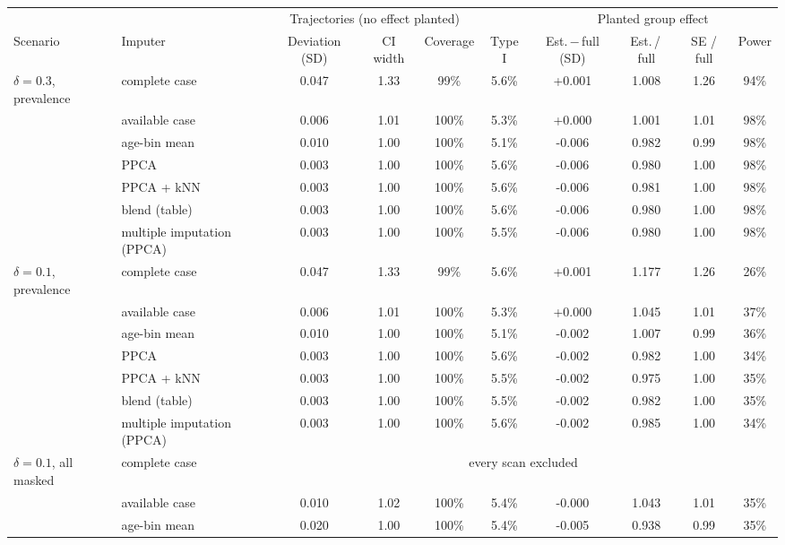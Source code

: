 \begin{tabular}{llcccccccc}
\toprule
 & & \multicolumn{3}{c}{Trajectories (no effect planted)} & & \multicolumn{4}{c}{Planted group effect} \\
\cmidrule(lr){3-5}\cmidrule(lr){7-10}
Scenario & Imputer & Deviation (SD) & CI width & Coverage & Type I & Est.\,$-$\,full (SD) & Est.\,/\,full & SE / full & Power \\
\midrule
$\delta=0.3$, prevalence & complete case & 0.047 & 1.33 & 99\% & 5.6\% & +0.001 & 1.008 & 1.26 & 94\% \\
 & available case & 0.006 & 1.01 & 100\% & 5.3\% & +0.000 & 1.001 & 1.01 & 98\% \\
 & age-bin mean & 0.010 & 1.00 & 100\% & 5.1\% & -0.006 & 0.982 & 0.99 & 98\% \\
 & PPCA & 0.003 & 1.00 & 100\% & 5.6\% & -0.006 & 0.980 & 1.00 & 98\% \\
 & PPCA + kNN & 0.003 & 1.00 & 100\% & 5.6\% & -0.006 & 0.981 & 1.00 & 98\% \\
 & blend (table) & 0.003 & 1.00 & 100\% & 5.6\% & -0.006 & 0.980 & 1.00 & 98\% \\
 & multiple imputation (PPCA) & 0.003 & 1.00 & 100\% & 5.5\% & -0.006 & 0.980 & 1.00 & 98\% \\
\addlinespace[2pt]
$\delta=0.1$, prevalence & complete case & 0.047 & 1.33 & 99\% & 5.6\% & +0.001 & 1.177 & 1.26 & 26\% \\
 & available case & 0.006 & 1.01 & 100\% & 5.3\% & +0.000 & 1.045 & 1.01 & 37\% \\
 & age-bin mean & 0.010 & 1.00 & 100\% & 5.1\% & -0.002 & 1.007 & 0.99 & 36\% \\
 & PPCA & 0.003 & 1.00 & 100\% & 5.6\% & -0.002 & 0.982 & 1.00 & 34\% \\
 & PPCA + kNN & 0.003 & 1.00 & 100\% & 5.5\% & -0.002 & 0.975 & 1.00 & 35\% \\
 & blend (table) & 0.003 & 1.00 & 100\% & 5.5\% & -0.002 & 0.982 & 1.00 & 35\% \\
 & multiple imputation (PPCA) & 0.003 & 1.00 & 100\% & 5.6\% & -0.002 & 0.985 & 1.00 & 34\% \\
\addlinespace[2pt]
$\delta=0.1$, all masked & complete case & \multicolumn{8}{c}{every scan excluded} \\
 & available case & 0.010 & 1.02 & 100\% & 5.4\% & -0.000 & 1.043 & 1.01 & 35\% \\
 & age-bin mean & 0.020 & 1.00 & 100\% & 5.4\% & -0.005 & 0.938 & 0.99 & 35\% \\

\end{tabular}
